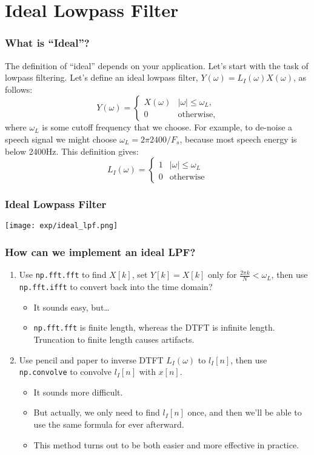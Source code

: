 \documentclass{beamer}
\begin{document}
\section[Ideal LPF]{Ideal Lowpass Filter}
\setcounter{subsection}{1}

\begin{frame}
  \frametitle{What is ``Ideal''?}
  
  The definition of ``ideal'' depends on your application.  Let's
  start with the task of lowpass filtering.  Let's define an ideal
  lowpass filter, $Y(\omega)=L_I(\omega)X(\omega)$, as follows:
  \[
  Y(\omega) = \begin{cases}X(\omega)& |\omega|\le\omega_L,\\
    0 & \mbox{otherwise},
  \end{cases}
  \]
  where $\omega_L$ is some cutoff frequency that we choose.  For
  example, to de-noise a speech signal we might choose $\omega_L=2\pi
  2400/F_s$, because most speech energy is below 2400Hz.  This
  definition gives:
  \[
  L_I(\omega)
  = \begin{cases} 1& |\omega|\le\omega_L\\
    0 & \mbox{otherwise}
  \end{cases}
  \]
\end{frame}

\begin{frame}
  \frametitle{Ideal Lowpass Filter}
  \centerline{\texttt{[image: exp/ideal\_lpf.png]}}
\end{frame}

\begin{frame}
  \frametitle{How can we implement an ideal LPF?}

  \begin{enumerate}
  \item Use {\tt np.fft.fft} to find $X[k]$, set $Y[k]=X[k]$ only for
    $\frac{2\pi k}{N}<\omega_L$, then use {\tt np.fft.ifft}
    to convert back into the time domain?
    \begin{itemize}
    \item It sounds easy, but\ldots
    \item {\tt np.fft.fft} is finite length, whereas the DTFT is
      infinite length.  Truncation to finite length causes artifacts.
    \end{itemize}
  \item Use pencil and paper to inverse DTFT $L_I(\omega)$ to $l_I[n]$,
    then use {\tt np.convolve} to convolve $l_I[n]$ with $x[n]$.
    \begin{itemize}
    \item It sounds more difficult.
    \item But actually, we only need to find $l_I[n]$ once, and
      then we'll be able to use the same formula for ever afterward.
    \item This method turns out to be both easier and more effective
      in practice.
    \end{itemize}
  \end{enumerate}
\end{frame}
\end{document}
